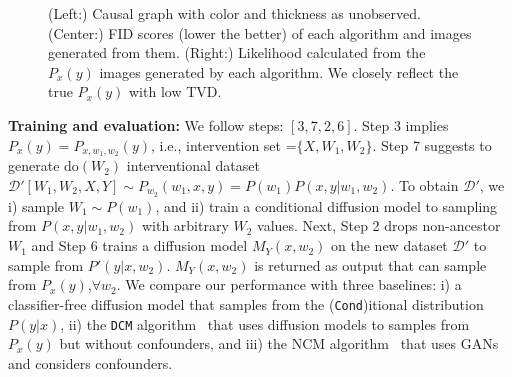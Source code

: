 \documentclass{article}
\newcommand{\red}{\textcolor{red}}
\newcommand{\vb}{\mathbf{v}}
\newcommand{\Do}{\text{do}}
\newcommand{\idgen}{\text{ID-GEN}\xspace}
\theoremstyle{plain}
\theoremstyle{definition}
\theoremstyle{remark}
\begin{document}
\begin{figure}[t!]
		\caption{(Left:) Causal graph with color and thickness as unobserved. 
  (Center:) FID scores (lower the better) of each algorithm and images generated from them.
   (Right:) 
   Likelihood calculated from the $P_{x}(y)$ images generated by each algorithm.
   We closely reflect the true $P_{x}(y)$ with low TVD. 
   }
   \vspace{-3mm}
	\label{fig:napkin-mnist}
\end{figure}
\par
\textbf{Training and evaluation:} 
We follow \idgen steps: $[3, 7, 2, 6]$. 
Step 3 implies $P_x(y) = P_{x,w_1,w_2}(y)$, i.e., intervention set =$\{X,W_1,W_2\}$.
Step 7 suggests to generate $\Do(W_2)$ interventional dataset $\mathcal{D}'[W_1,W_2,X,Y] \sim P_{w_2}(w_1,x,y)= P(w_1)P(x,y|w_1,w_2)$.
To obtain $\mathcal{D}'$, we i) sample $W_1\!\sim\!P(w_1)$, and ii) train a conditional diffusion model to sampling from $P(x,y|w_1,w_2)$ with arbitrary $W_2$ values.
Next, Step 2 drops non-ancestor $W_1$ and Step 6 trains a diffusion model $M_Y(x, w_2)$ on the new dataset  $\mathcal{D}'$ to sample from $P'(y|x, w_2)$. 
 $M_Y(x, w_2)$ is returned as output that can sample from $P_x(y)$,$\forall w_2$.
%
%
%
%
%
We compare our performance with three baselines:
i) a classifier-free diffusion model that samples from the (\texttt{Cond})itional distribution $P(y|x)$, ii) the \texttt{DCM} algorithm~\citep{chao2023interventional} that uses diffusion models to samples from $P_x(y)$ but without confounders, and iii) the NCM algorithm~\citep{xia2021causal} that uses GANs and considers confounders.
%
\end{document}

